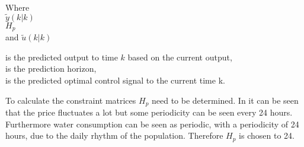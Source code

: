  \begin{minipage}[t]{0.20\textwidth}
 Where\\
 \hspace*{8mm} $\tilde y(k|k)$ \\
 \hspace*{8mm} $H_p$ \\
 and \hspace*{0.7mm} $\tilde u(k|k)$	
 \end{minipage}
 \begin{minipage}[t]{0.68\textwidth}
 \vspace*{2mm}
 is the predicted output to time $k$ based on the current output, \\
 is the prediction horizon,\\
 is the predicted optimal control signal to the current time k.
 \end{minipage}

To calculate the constraint matrices $H_p$ need to be determined. In  it can be seen that the price fluctuates a lot but some periodicity can be seen every 24 hours. Furthermore water consumption can be seen as periodic, with a periodicity of 24 hours, due to the daily rhythm of the population. Therefore $H_p$ is chosen to 24. 





